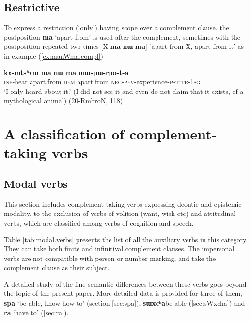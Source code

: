 \documentclass[oneside,a4paper,11pt]{article}
\newcommand{\ipa}[1]{\textbf{\phon#1}} %
\newcommand{\jpg}[2]{\ipa{#1} `#2'} %
\begin{document}
\subsection{Restrictive} 
To express a restriction (`only') having scope over a complement clause, the postposition \ipa{ma} `apart from' is used after the complement, sometimes with the postposition repeated two times [X \ipa{ma} \ipa{nɯ} \ipa{ma}] `apart from X, apart from it' as in example (\ref{ex:manWma.compl})

\begin{exe}
\ex \label{ex:manWma.compl}
\gll \ipa{kɤ-mtsʰɤm} 	\ipa{ma} 	\ipa{nɯ} 	\ipa{ma} 	\ipa{mɯ-pɯ-rɲo-t-a} \\
\textsc{inf}-hear apart.from \textsc{dem} apart.from \textsc{neg-pfv}-experience-\textsc{pst:tr-1sg} \\
\glt `I only heard about it.' (I did not see it and even do not claim that it exists, of a mythological animal) (20-RmbroN, 118)
\end{exe}
 
  \section{A classification of complement-taking verbs} 
  \subsection{Modal verbs}
This section includes complement-taking verbs expressing deontic and epistemic modality, to the exclusion of verbs of volition (want, wish etc) and attitudinal verbs, which are classified among verbs of cognition and speech.

Table \ref{tab:modal.verbs} presents the list of all the auxiliary verbs in this category. They can take both finite and infinitival complement clauses. The impersonal verbs are not compatible with person or number marking, and take the complement clause as their subject. 

A detailed study of the fine semantic differences between these verbs goes beyond the topic of the present paper. More detailed data is provided for three of them, \jpg{spa}{be able, know how to} (section \ref{sec:spa}), \ipa{sɯxcʰa}{be able} (\ref{sec:sWxcha}) and \jpg{ra}{have to} (\ref{sec:ra}).
\end{document}
